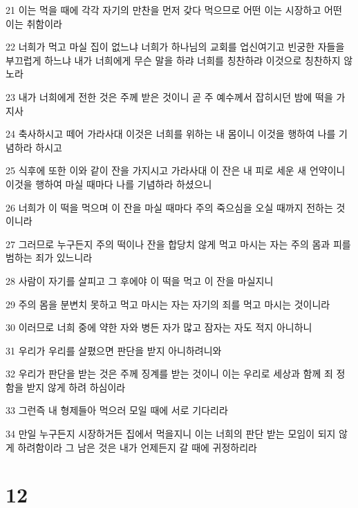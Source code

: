 \par 21 이는 먹을 때에 각각 자기의 만찬을 먼저 갖다 먹으므로 어떤 이는 시장하고 어떤 이는 취함이라
\par 22 너희가 먹고 마실 집이 없느냐 너희가 하나님의 교회를 업신여기고 빈궁한 자들을 부끄럽게 하느냐 내가 너희에게 무슨 말을 하랴 너희를 칭찬하랴 이것으로 칭찬하지 않노라
\par 23 내가 너희에게 전한 것은 주께 받은 것이니 곧 주 예수께서 잡히시던 밤에 떡을 가지사
\par 24 축사하시고 떼어 가라사대 이것은 너희를 위하는 내 몸이니 이것을 행하여 나를 기념하라 하시고
\par 25 식후에 또한 이와 같이 잔을 가지시고 가라사대 이 잔은 내 피로 세운 새 언약이니 이것을 행하여 마실 때마다 나를 기념하라 하셨으니
\par 26 너희가 이 떡을 먹으며 이 잔을 마실 때마다 주의 죽으심을 오실 때까지 전하는 것이니라
\par 27 그러므로 누구든지 주의 떡이나 잔을 합당치 않게 먹고 마시는 자는 주의 몸과 피를 범하는 죄가 있느니라
\par 28 사람이 자기를 살피고 그 후에야 이 떡을 먹고 이 잔을 마실지니
\par 29 주의 몸을 분변치 못하고 먹고 마시는 자는 자기의 죄를 먹고 마시는 것이니라
\par 30 이러므로 너희 중에 약한 자와 병든 자가 많고 잠자는 자도 적지 아니하니
\par 31 우리가 우리를 살폈으면 판단을 받지 아니하려니와
\par 32 우리가 판단을 받는 것은 주께 징계를 받는 것이니 이는 우리로 세상과 함께 죄 정함을 받지 않게 하려 하심이라
\par 33 그런즉 내 형제들아 먹으러 모일 때에 서로 기다리라
\par 34 만일 누구든지 시장하거든 집에서 먹을지니 이는 너희의 판단 받는 모임이 되지 않게 하려함이라 그 남은 것은 내가 언제든지 갈 때에 귀정하리라

\chapter{12}

